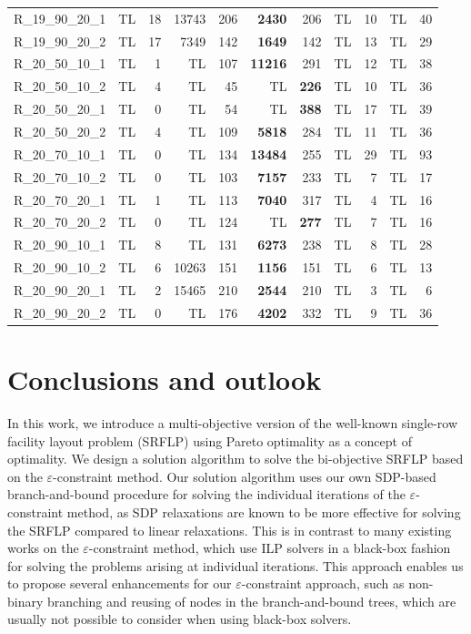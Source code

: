 \documentclass{article}
\newcommand{\SRFLP}{SRFLP\xspace}
\begin{document}
\begin{longtable}{lrrrrrrrrrr}
R\_19\_90\_20\_1 & TL & 18 & 13743 & 206 & \textbf{2430} & 206 & TL & 10 & TL & 40 \\
R\_19\_90\_20\_2 & TL & 17 & 7349 & 142 & \textbf{1649} & 142 & TL & 13 & TL & 29 \\
R\_20\_50\_10\_1 & TL & 1 & TL & 107 & \textbf{11216} & 291 & TL & 12 & TL & 38 \\
R\_20\_50\_10\_2 & TL & 4 & TL & 45 & TL & \textbf{226} & TL & 10 & TL & 36 \\
R\_20\_50\_20\_1 & TL & 0 & TL & 54 & TL & \textbf{388} & TL & 17 & TL & 39 \\
R\_20\_50\_20\_2 & TL & 4 & TL & 109 & \textbf{5818} & 284 & TL & 11 & TL & 36 \\
R\_20\_70\_10\_1 & TL & 0 & TL & 134 & \textbf{13484} & 255 & TL & 29 & TL & 93 \\
R\_20\_70\_10\_2 & TL & 0 & TL & 103 & \textbf{7157} & 233 & TL & 7 & TL & 17 \\
R\_20\_70\_20\_1 & TL & 1 & TL & 113 & \textbf{7040} & 317 & TL & 4 & TL & 16 \\
R\_20\_70\_20\_2 & TL & 0 & TL & 124 & TL & \textbf{277} & TL & 7 & TL & 16 \\
R\_20\_90\_10\_1 & TL & 8 & TL & 131 & \textbf{6273} & 238 & TL & 8 & TL & 28 \\
R\_20\_90\_10\_2 & TL & 6 & 10263 & 151 & \textbf{1156} & 151 & TL & 6 & TL & 13 \\
R\_20\_90\_20\_1 & TL & 2 & 15465 & 210 & \textbf{2544} & 210 & TL & 3 & TL & 6 \\
R\_20\_90\_20\_2 & TL & 0 & TL & 176 & \textbf{4202} & 332 & TL & 9 & TL & 36 
\end{longtable}
\endgroup{}


\section{Conclusions and outlook}\label{sec:conclusion}

In this work, we introduce a multi-objective version of the well-known single-row facility layout problem (\SRFLP) using Pareto optimality as a concept of optimality. 
We design a solution algorithm to solve the bi-objective \SRFLP based on the $\varepsilon$-constraint method. Our solution algorithm uses our own SDP-based branch-and-bound procedure for solving the individual iterations of the $\varepsilon$-constraint method, as SDP relaxations are known to be more effective for solving the \SRFLP compared to linear relaxations. This is in contrast to many existing works on the $\varepsilon$-constraint method, which use ILP solvers in a black-box fashion for solving the problems arising at individual iterations. This approach enables us to propose several enhancements for our $\varepsilon$-constraint approach, such as non-binary branching and reusing of nodes in the branch-and-bound trees, which are usually not possible to consider when using black-box solvers. 
\end{document}
